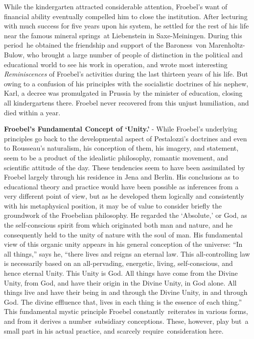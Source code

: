 \documentclass[]{book}
\begin{document}
While the kindergarten attracted considerable attention, Froebel's want of financial ability eventually compelled him to close the institution. After lecturing with much success for five years upon his system, he settled for the rest of his life near the famous mineral springs~at Liebenstein in Saxe-Meiningen. During this period~he obtained the friendship and support of the Baroness~von Marenholtz-Bulow, who brought a large number of people of distinction in the political and educational world to see his work in operation, and wrote most interesting \emph{Reminiscences} of Froebel's activities during the last thirteen years of his life. But owing to a confusion of his principles with the socialistic doctrines of his nephew, Karl, a decree was promulgated in Prussia by the minister of education, closing all kindergartens there. Froebel never recovered from this unjust humiliation, and died within a year.

\textbf{Froebel's Fundamental Concept of `Unity.'} - While Froebel's underlying principles go back to the developmental aspect of Pestalozzi's doctrines and even to Rousseau's naturalism, his conception of them, his imagery, and statement, seem to be a product of the idealistic philosophy, romantic movement, and scientific attitude of the day. These tendencies seem to have been assimilated by Froebel largely through his residence in Jena and Berlin. His conclusions as to educational theory and practice would have been possible as inferences from a very different point of view, but as he developed them logically and consistently with his metaphysical position, it may be of value to consider briefly the groundwork of the Froebelian philosophy. He regarded the `Absolute,' or God, as the self-conscious spirit from which originated both man and nature, and he consequently held to the unity of nature with the soul of man. His fundamental view of this organic unity appears in his general conception of the universe: ``In all things,'' says he, ``there lives and reigns an eternal law. This all-controlling law is necessarily based on an all-pervading, energetic, living, self-conscious, and hence eternal Unity. This Unity is God. All things have come from the Divine Unity, from God, and have their origin in the Divine Unity, in God alone. All things live and have their being in and through the Divine Unity, in and through God. The divine effluence that, lives in each thing is the essence of each thing.'' This fundamental mystic principle Froebel constantly~reiterates in various forms, and from it derives a number~subsidiary conceptions. These, however, play but~a small part in his actual practice, and scarcely require~consideration here.
\end{document}
